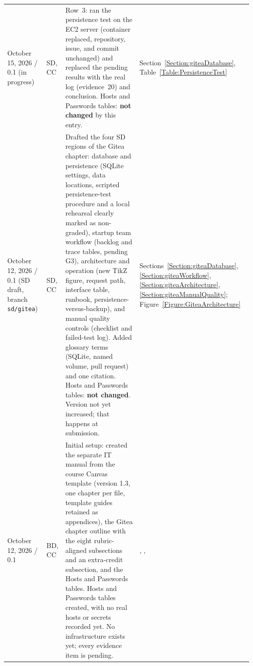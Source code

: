 \begin{tabularx}{\linewidth}{L{3.1cm}L{2.2cm}YL{2.0cm}}
October 15, 2026 / 0.1 (in progress) & SD, CC & Row~3: ran the persistence test on the EC2 server (container replaced, repository, issue, and commit unchanged) and replaced the pending results with the real log (evidence~20) and conclusion. Hosts and Passwords tables: \textbf{not changed} by this entry. & Section~\ref{Section:giteaDatabase}, Table~\ref{Table:PersistenceTest}\\
October 12, 2026 / 0.1 (SD draft, branch \texttt{sd/gitea}) & SD, CC & Drafted the four SD regions of the Gitea chapter: database and persistence (SQLite settings, data locations, scripted persistence-test procedure and a local rehearsal clearly marked as non-graded), startup team workflow (backlog and trace tables, pending G3), architecture and operation (new TikZ figure, request path, interface table, runbook, persistence-versus-backup), and manual quality controls (checklist and failed-test log). Added glossary terms (SQLite, named volume, pull request) and one citation. Hosts and Passwords tables: \textbf{not changed}. Version not yet increased; that happens at submission. & Sections~\ref{Section:giteaDatabase}, \ref{Section:giteaWorkflow}, \ref{Section:giteaArchitecture}, \ref{Section:giteaManualQuality}; Figure~\ref{Figure:GiteaArchitecture}\\
October 12, 2026 / 0.1 & BD, CC & Initial setup: created the separate IT manual from the course Canvas template (version 1.3, one chapter per file, template guides retained as appendices), the Gitea chapter outline with the eight rubric-aligned subsections and an extra-credit subsection, and the Hosts and Passwords tables. Hosts and Passwords tables created, with no real hosts or secrets recorded yet. No infrastructure exists yet; every evidence item is pending. & , , \\
\end{tabularx}
